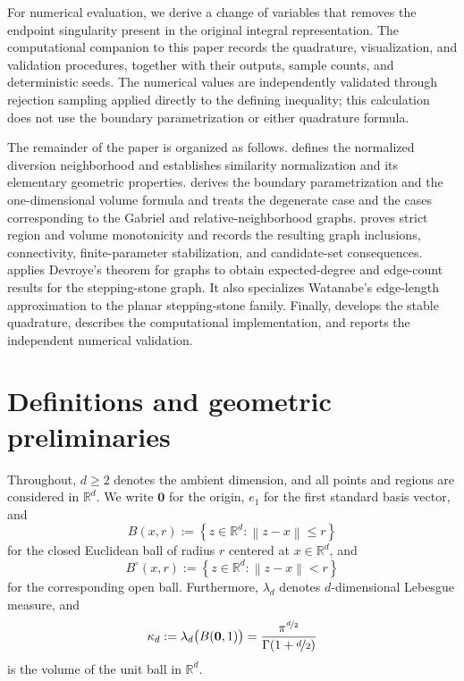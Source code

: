 \documentclass[a4paper,fleqn]{cas-dc}
\theoremstyle{definition}
\theoremstyle{remark}
\newcommand{\R}{\mathds{R}}
\newcommand{\norm}[1]{\left\lVert #1\right\rVert}
\newcommand{\set}[1]{\left\{#1\right\}}
\newcommand{\0}{\mathbf{0}}
\begin{document}
For numerical evaluation, we derive a change of variables that removes the
endpoint singularity present in the original integral representation. 
The computational companion to this paper \citep{espino2026computational} records the quadrature,
visualization, and validation procedures, together with their outputs,
sample counts, and deterministic seeds. The numerical values are
independently validated through rejection sampling applied directly to the
defining inequality; this calculation does not use the boundary
parametrization or either quadrature formula.



The remainder of the paper is organized as follows.
 defines the normalized diversion neighborhood and
establishes similarity normalization and its elementary geometric
properties.
 derives the boundary parametrization and the
one-dimensional volume formula and treats the degenerate case and the cases corresponding to the Gabriel and relative-neighborhood graphs.
 proves strict region and volume monotonicity
and records the resulting graph inclusions, connectivity,
finite-parameter stabilization, and candidate-set consequences.
 applies Devroye's
theorem for graphs to obtain expected-degree and edge-count
results for the stepping-stone graph. It also specializes Watanabe's
edge-length approximation to the planar stepping-stone family.
Finally,  develops the stable quadrature, describes the
computational implementation, and reports the independent numerical validation.


\section{Definitions and geometric preliminaries}
\label{sec:geometry}

Throughout, $d\geq2$ denotes the ambient dimension, and all points and
regions are considered in $\R^d$. 
We write $\0$ for the origin, $e_1$ for the first standard basis vector,
and
\begin{equation}
    B(x,r)
    :=
    \set{z\in\R^d:\norm{z-x}\leq r}
\end{equation}
for the closed Euclidean ball of radius $r$ centered at $x\in\R^d$, and
\begin{equation}
    B^\circ(x,r)
    :=
    \set{z\in\R^d:\norm{z-x}<r}
\end{equation}
for the corresponding open ball.
Furthermore, $\lambda_d$ denotes $d$-dimensional Lebesgue measure, and
\begin{equation}
    \kappa_d
    :=
    \lambda_d\bigl(B(\0,1)\bigr)
    =
    \frac{\pi^{\nicefrac{d}{2}}}{\Gamma(1+\nicefrac{d}{2})}
\end{equation}
is the volume of the unit ball in $\R^d$.
\end{document}

